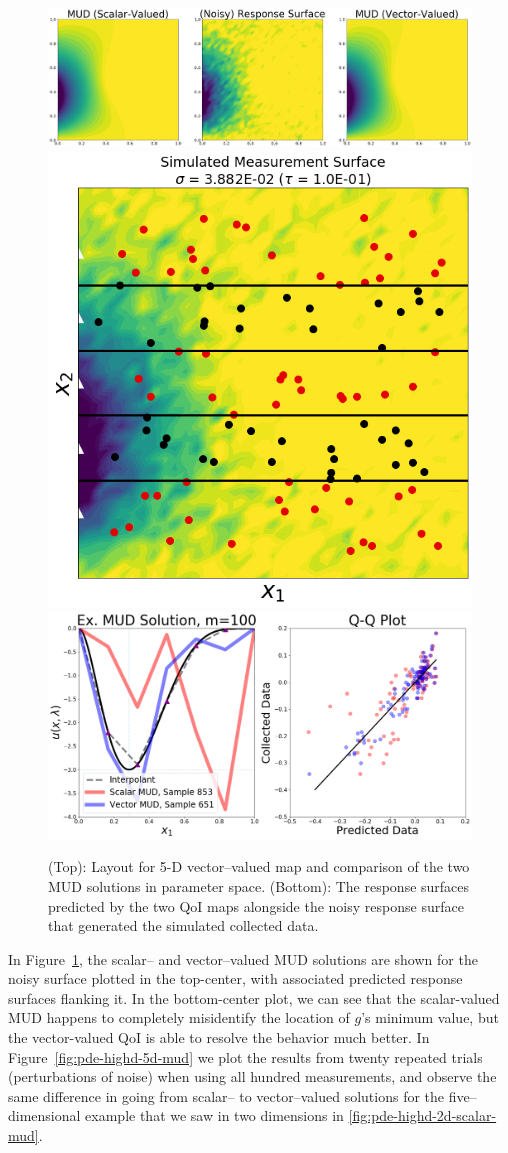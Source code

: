 \begin{figure}[htbp]
\centering
  \includegraphics[width=0.95\linewidth]{figures/pde-highd/pde-highd_surf_exmud_D5_m100}
  \includegraphics[width=0.35\linewidth]{figures/pde-highd/pde-highd_sensors_D5}
  \includegraphics[width=0.6\linewidth]{figures/pde-highd/pde-highd_comp_exmud_D5_m100}
\caption{
(Top): Layout for 5-D vector--valued map and comparison of the two MUD solutions in parameter space.
(Bottom): The response surfaces predicted by the two QoI maps alongside the noisy response surface that generated the simulated collected data.
}
\label{fig:pde-highd-5d-example}
\end{figure}

In Figure~\ref{fig:pde-highd-5d-example}, the scalar-- and vector--valued MUD solutions are shown for the noisy surface plotted in the top-center, with associated predicted response surfaces flanking it.
In the bottom-center plot, we can see that the scalar-valued MUD happens to completely misidentify the location of $g$'s minimum value, but the vector-valued QoI is able to resolve the behavior much better.
In Figure~\ref{fig:pde-highd-5d-mud} we plot the results from twenty repeated trials (perturbations of noise) when using all hundred measurements, and observe the same difference in going from scalar-- to vector--valued solutions for the five--dimensional example that we saw in two dimensions in \ref{fig:pde-highd-2d-scalar-mud}.

